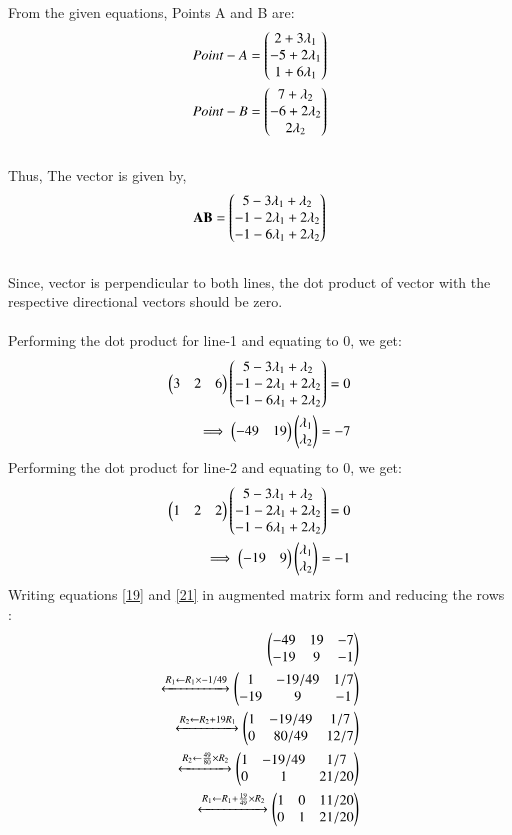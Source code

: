 \documentclass[journal,12pt,twocolumn]{IEEEtran}
\begin{document}
\\
From the given equations, Points A and B are:
\\
\begin{align}
   Point-A = \begin{pmatrix}2+3\lambda_1 \\ -5+2\lambda_1 \\ 1+6\lambda_1\end{pmatrix} \label{15} \\ 
   Point-B= \begin{pmatrix}7+\lambda_2 \\ -6+2\lambda_2 \\ 2\lambda_2\end{pmatrix} \label{16} 
\end{align}
\\
Thus, The vector  is given by,
\begin{align}
   \mathbf{AB}= \begin{pmatrix}5-3\lambda_1+\lambda_2 \\ -1-2\lambda_1+2\lambda_2\\ -1-6\lambda_1+2\lambda_2\end{pmatrix}
\end{align}
\\
Since, vector  is perpendicular to both lines, the dot product of vector  with the respective directional vectors should be zero. \\
\\
Performing the dot product for line-1 and equating to 0, we get:
\begin{align}
\begin{pmatrix}3 & 2 & 6\end{pmatrix}
\begin{pmatrix}5-3\lambda_1+\lambda_2 \\ -1-2\lambda_1+2\lambda_2\\ -1-6\lambda_1+2\lambda_2\end{pmatrix} = 0 \\
\implies \begin{pmatrix}-49 & 19\end{pmatrix}\begin{pmatrix}\lambda_1 \\ \lambda_2\end{pmatrix}=-7 \label{19}
\end{align}
\newpage \noindent
Performing the dot product for line-2 and equating to 0, we get:
\begin{align}
\begin{pmatrix}1 & 2 & 2\end{pmatrix}
\begin{pmatrix}5-3\lambda_1+\lambda_2 \\ -1-2\lambda_1+2\lambda_2\\ -1-6\lambda_1+2\lambda_2\end{pmatrix} = 0 \\
\implies \begin{pmatrix}-19 & 9\end{pmatrix}\begin{pmatrix}\lambda_1 \\ \lambda_2\end{pmatrix}=-1 \label{21}
\end{align}
Writing equations \ref{19} and \ref{21} in augmented matrix form and reducing the rows :\\
\begin{align}
\begin{pmatrix}-49 & 19 & -7\\-19 & 9 & -1\end{pmatrix}\\
\xleftrightarrow[]{R_1\leftarrow R_1\times-1/49}
\begin{pmatrix}1 & -19/49 & 1/7\\-19 & 9 & -1\end{pmatrix}\\
\xleftrightarrow[]{R_2\leftarrow R_2+19R_1}
\begin{pmatrix}1 & -19/49 & 1/7\\0 & 80/49 & 12/7\end{pmatrix}\\
\xleftrightarrow[]{R_2\leftarrow \frac{49}{80}\times R_2}
\begin{pmatrix}1 & -19/49 & 1/7\\0 & 1 & 21/20\end{pmatrix}\\
\xleftrightarrow[]{R_1\leftarrow R_1+\frac{19}{49}\times R_2}
\begin{pmatrix}1 & 0 & 11/20\\0 & 1 & 21/20\end{pmatrix}
\end{align}
\end{document}
